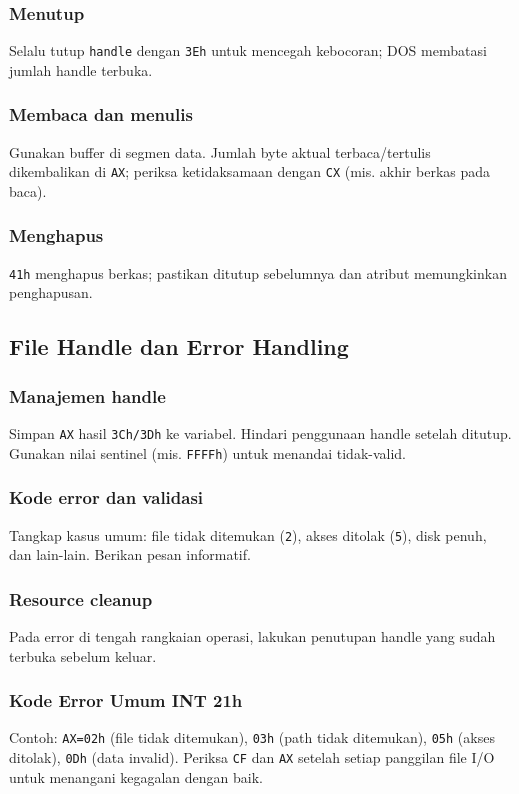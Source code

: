 \subsubsection{Menutup}
Selalu tutup \texttt{handle} dengan \texttt{3Eh} untuk mencegah kebocoran; DOS membatasi jumlah handle terbuka.

\subsubsection{Membaca dan menulis}
Gunakan buffer di segmen data. Jumlah byte aktual terbaca/tertulis dikembalikan di \texttt{AX}; periksa ketidaksamaan dengan \texttt{CX} (mis. akhir berkas pada baca).

\subsubsection{Menghapus}
\texttt{41h} menghapus berkas; pastikan ditutup sebelumnya dan atribut memungkinkan penghapusan.

\subsection{File Handle dan Error Handling}
\subsubsection{Manajemen handle}
Simpan \texttt{AX} hasil \texttt{3Ch/3Dh} ke variabel. Hindari penggunaan handle setelah ditutup. Gunakan nilai sentinel (mis. \texttt{FFFFh}) untuk menandai tidak-valid.

\subsubsection{Kode error dan validasi}
Tangkap kasus umum: file tidak ditemukan (\texttt{2}), akses ditolak (\texttt{5}), disk penuh, dan lain-lain. Berikan pesan informatif.

\subsubsection{Resource cleanup}
Pada error di tengah rangkaian operasi, lakukan penutupan handle yang sudah terbuka sebelum keluar.

\subsubsection{Kode Error Umum INT 21h}
Contoh: \texttt{AX=02h} (file tidak ditemukan), \texttt{03h} (path tidak ditemukan), \texttt{05h} (akses ditolak), \texttt{0Dh} (data invalid). Periksa \texttt{CF} dan \texttt{AX} setelah setiap panggilan file I/O untuk menangani kegagalan dengan baik. 
